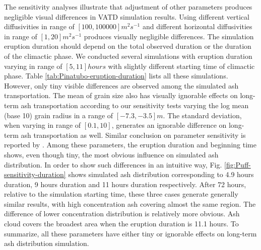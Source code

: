 \documentclass[utf8]{frontiersSCNS} %
\begin{document}
The sensitivity analyses illustrate that adjustment of other parameters produces negligible visual differences in VATD simulation results. Using different vertical diffusivities in range of $[100, 100000] m^2s^{-1} $ and different horizontal diffusivities in range of $[1, 20] m^2s^{-1}$ produces visually negligible differences. The simulation eruption duration should depend on the total observed duration or the duration of the climactic phase. We conducted several simulations with eruption duration varying in range of $[5, 11] hours$ with slightly different starting time of climactic phase. Table \ref{tab:Pinatubo-eruption-duration} lists all these simulations. However, only tiny visible differences are observed among the simulated ash transportation. The mean of grain size also has visually ignorable effects on long-term ash transportation according to our sensitivity tests varying the log mean (base 10) grain radius in a range of $[-7.3, -3.5] m$. The standard deviation, when varying in range of $[0.1, 10]$, generates an ignorable difference on long-term ash transportation as well. Similar conclusion on parameter sensitivity is reported by \citet[e.g.][]{fero2008simulation, daniele2009applications}. Among these parameters, the eruption duration and beginning time shows, even though tiny, the most obvious influence on simulated ash distribution. In order to show such differences in an intuitive way, Fig. \ref{fig:Puff-sensitivity-duration} shows simulated ash distribution corresponding to 4.9 hours duration, 9 hours duration and 11 hours duration respectively. After 72 hours, relative to the simulation starting time, these three cases generate generally similar results, with high concentration ash covering almost the same region. The difference of lower concentration distribution is relatively more obvious. Ash cloud covers the broadest area when the eruption duration is 11.1 hours. To summarize, all these parameters have either tiny or ignorable effects on long-term ash distribution simulation.
\end{document}
